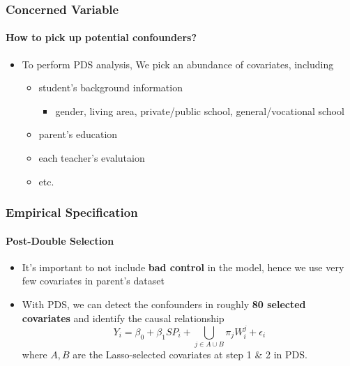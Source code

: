 \documentclass{beamer}
\begin{document}
\begin{frame} %
\frametitle{Concerned Variable}
\framesubtitle{How to pick up potential confounders?}

    \begin{itemize}
        \item To perform PDS analysis, We pick an abundance of covariates, including 
            \begin{itemize}
                \item student's background information
                \begin{itemize}
                    \item gender, living area, private/public school, general/vocational school
                \end{itemize}        
                \item parent's education
                \item each teacher's evalutaion 
                \item etc. 
            \end{itemize}
    \end{itemize}

\end{frame}


\begin{frame} %
\frametitle{Empirical Specification}
\framesubtitle{Post-Double Selection}

    \begin{itemize}
        \item It's important to not include \textbf{bad control} in the model, hence we use very few covariates in parent's dataset
        \item With PDS, we can detect the confounders in roughly \textbf{80 selected covariates} and identify the causal relationship
        \[
        Y_i = \beta_0 + \beta_1 \textit{SP}_i + \bigcup_{j \in A \cup B} \pi_j W_i^j + \epsilon_i
        \]
        where $A,B$ are the Lasso-selected covariates at step 1 \& 2 in PDS.
    \end{itemize}

\end{frame}
    
\end{document}

